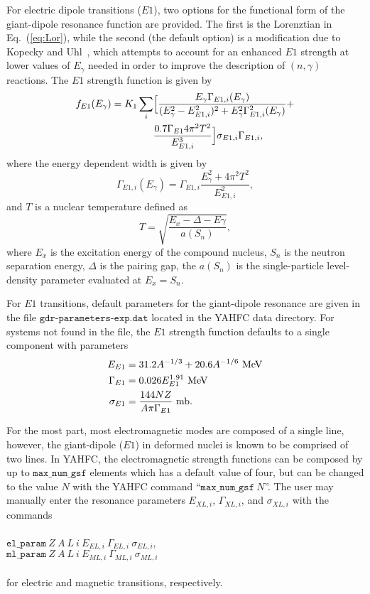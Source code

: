 \documentclass[
10pt,
showpacs,preprintnumbers,footinbib,
amsfonts,amsmath,amssymb,
aps,
prc,twocolumn,groupedaddress,superscriptaddress,
showkeys,
nofootinbib
]{revtex4-1}
\begin{document}
For electric dipole transitions ($E1$), two options for the functional form of the giant-dipole resonance function are provided. The first is the Lorenztian in Eq.~(\ref{eq:Lor}), while the second (the default option) is a modification due to Kopecky and Uhl~\cite{Kopecky:1990}, which attempts to account for an enhanced $E1$ strength at lower values of $E_\gamma$ needed in order to improve  the description of $(n,\gamma)$ reactions. The $E1$ strength function is given by
\begin{align}
f_{E1}(E_\gamma ) = K_1 \sum_i & \Bigl[ \frac{E_\gamma\Gamma_{E1,i}(E_\gamma)}{(E_\gamma^2 - E^2_{E1,i})^2+E^2_\gamma\Gamma^2_{E1,i}(E_\gamma)} +\notag\\
& \frac{0.7\Gamma_{E1}4\pi^2 T^2}{E_{E1,i}^3}\Bigr ]\sigma_{E1,i}\Gamma_{E1,i},
\end{align}
where the energy dependent width is given by
\begin{equation}
\Gamma_{E1,i}(E_\gamma) = \Gamma_{E1,i}\frac{ E_\gamma^2+4\pi^2T^2} {E^2_{E1,i}},
\end{equation} 
and $T$ is a nuclear temperature defined as
\begin{equation}
T = \sqrt{\frac{ E_x -\Delta - E\gamma} {a(S_n)}},
\end{equation}
where $E_x$ is the excitation energy of the compound nucleus, $S_n$ is the neutron separation energy, $\Delta$ is the pairing gap, the $a(S_n)$ is the single-particle level-density parameter evaluated at $E_x=S_n$.

For $E1$ transitions, default parameters for the giant-dipole resonance are given in the file ${\texttt{gdr-parameters-exp.dat}}$ located in the YAHFC data directory. For systems not found in the file, the $E1$ strength function defaults to a single component with parameters
\begin{align}
E_{E1} &= 31.2A^{-1/3} + 20.6A^{-1/6}~{\text{MeV}}  \notag \\
\Gamma_{E1} &=  0.026E_{E1}^{1.91}~{\text{MeV}} \notag \\
\sigma_{E1} &= \frac{144 N Z}{A\pi \Gamma_{E1}}~{\text{mb}}. 
\end{align}

For the most part, most electromagnetic modes are composed of a single line, however, the giant-dipole ($E1$) in deformed nuclei is known to be comprised of two lines. In YAHFC, the electromagnetic strength functions can be composed by up to ${\texttt{max\_num\_gsf}}$ elements which has a default value of four, but can be changed to the value $N$ with the YAHFC command ``${\texttt{max\_num\_gsf}}~N$''. The user may manually enter the resonance parameters $E_{XL,i}$, 
$\Gamma_{XL,i}$, and $\sigma_{XL,i}$ with the commands\\
\\
${\texttt{el\_param}}~Z~A~L~i~E_{EL,i}~\Gamma_{EL,i} ~ \sigma_{EL,i }$, \\
${\texttt{ml\_param}}~Z~A~L~i~E_{ML,i}~\Gamma_{ML,i}~\sigma_{ML,i}$\\
\\
for electric and magnetic transitions, respectively.
\end{document}
